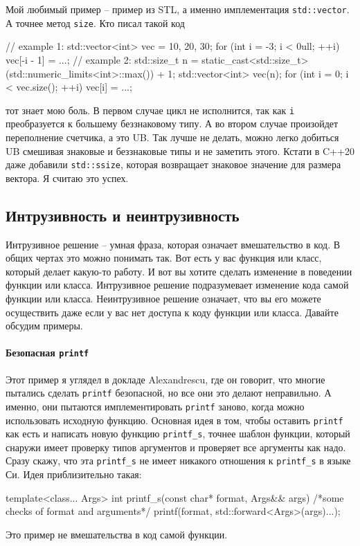 Мой любимый пример -- пример из STL, а именно имплементация \verb"std::vector".
А точнее метод \verb"size".
Кто писал такой код
\begin{cppcode}
// example 1:
std::vector<int> vec = {10, 20, 30};
for (int i = -3; i < 0ull; ++i)
  vec[-i - 1] = ...;
// example 2:
std::size_t n = static_cast<std::size_t>(std::numeric_limits<int>::max()) + 1;
std::vector<int> vec(n);
for (int i = 0; i < vec.size(); ++i)
  vec[i]  = ...;
\end{cppcode}
тот знает мою боль.
В первом случае цикл не исполнится, так как \verb"i" преобразуется к большему беззнаковому типу.
А во втором случае произойдет переполнение счетчика, а это UB.
Так лучше не делать, можно легко добиться UB смешивая знаковые и беззнаковые типы и не заметить этого.
Кстати в C++20 даже добавили \verb"std::ssize", которая возвращает знаковое значение для размера вектора.
Я считаю это успех.

\subsection{Интрузивность и неинтрузивность}

Интрузивное решение -- умная фраза, которая означает вмешательство в код.
В общих чертах это можно понимать так.
Вот есть у вас функция или класс, который делает какую-то работу.
И вот вы хотите сделать изменение в поведении функции или класса.
Интрузивное решение подразумевает изменение кода самой функции или класса.
Неинтрузивное решение означает, что вы его можете осуществить даже если у вас нет доступа к коду функции или класса.
Давайте обсудим примеры.

\paragraph{Безопасная \texttt{printf}}

Этот пример я углядел в докладе Alexandrescu, где он говорит, что многие пытались сделать \verb"printf" безопасной, но все они это делают неправильно. А именно, они пытаются имплементировать \verb"printf" заново, когда можно использовать исходную функцию.
Основная идея в том, чтобы оставить \verb"printf" как есть и написать новую функцию \verb"printf_s", точнее шаблон функции, который снаружи имеет проверку типов аргументов и проверяет все аргументы как надо.
Сразу скажу, что эта \verb"printf_s" не имеет никакого отношения к \verb"printf_s" в языке Си.
Идея приблизительно такая:
\begin{cppcode}
template<class... Args>
int printf_s(const char* format, Args&& args) {
  /*some checks of format and arguments*/
  printf(format, std::forward<Args>(args)...);
}
\end{cppcode}
Это пример не вмешательства в код самой функции.

